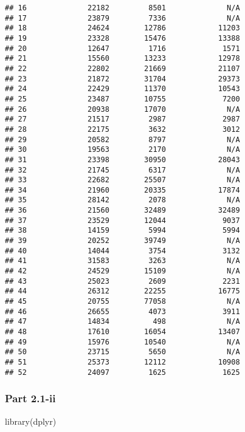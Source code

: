 \documentclass[
]{article}
\newenvironment{Shaded}{\begin{snugshade}}{\end{snugshade}}
\newcommand{\FunctionTok}[1]{\textcolor[rgb]{0.00,0.00,0.00}{#1}}
\newcommand{\NormalTok}[1]{#1}
\begin{document}
\begin{verbatim}
## 16              22182         8501              N/A
## 17              23879         7336              N/A
## 18              24624        12786            11203
## 19              23328        15476            13388
## 20              12647         1716             1571
## 21              15560        13233            12978
## 22              22802        21669            21107
## 23              21872        31704            29373
## 24              22429        11370            10543
## 25              23487        10755             7200
## 26              20938        17070              N/A
## 27              21517         2987             2987
## 28              22175         3632             3012
## 29              20582         8797              N/A
## 30              19563         2170              N/A
## 31              23398        30950            28043
## 32              21745         6317              N/A
## 33              22682        25507              N/A
## 34              21960        20335            17874
## 35              28142         2078              N/A
## 36              21560        32489            32489
## 37              23529        12044             9037
## 38              14159         5994             5994
## 39              20252        39749              N/A
## 40              14044         3754             3132
## 41              31583         3263              N/A
## 42              24529        15109              N/A
## 43              25023         2609             2231
## 44              26312        22255            16775
## 45              20755        77058              N/A
## 46              26655         4073             3911
## 47              14834          498              N/A
## 48              17610        16054            13407
## 49              15976        10540              N/A
## 50              23715         5650              N/A
## 51              25373        12112            10908
## 52              24097         1625             1625
\end{verbatim}

\hypertarget{part-2.1-ii}{%
\subsubsection{Part 2.1-ii}\label{part-2.1-ii}}

\begin{Shaded}
\begin{Highlighting}[]
\FunctionTok{library}\NormalTok{(dplyr)}
\end{Highlighting}
\end{Shaded}
\end{document}
